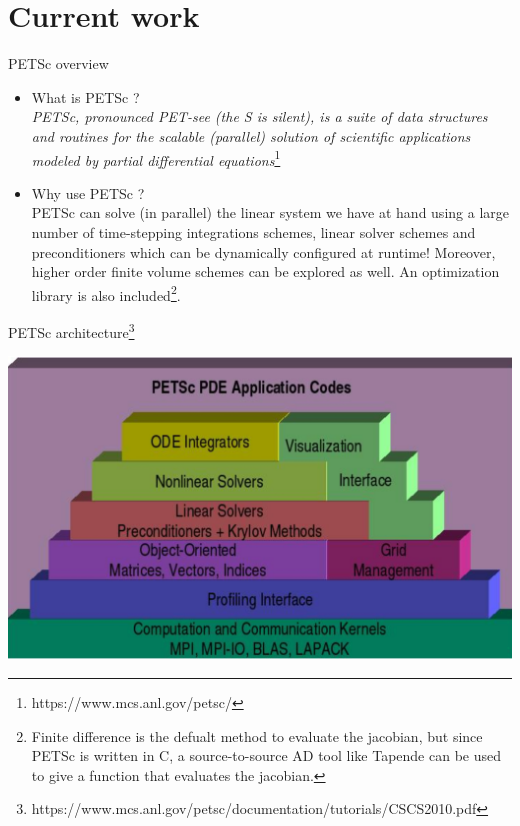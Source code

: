 \documentclass{beamer}
\begin{document}
\section{Current work}

\begin{frame}{PETSc overview}
\begin{itemize}
	\item What is PETSc ? 
	\\
		\qquad \textit{PETSc, pronounced PET-see (the S is silent), is a suite of data structures and routines for the scalable (parallel) solution of scientific applications modeled by partial differential equations}\footnote{https://www.mcs.anl.gov/petsc/}	\\
	\item Why use PETSc ?
	\\
		\qquad	PETSc can solve (in parallel) the linear system we have at hand using a large number of time-stepping integrations schemes, linear solver schemes and preconditioners which can be dynamically configured at runtime! Moreover, higher order finite volume schemes can be explored as well. An optimization library is also included\footnote{Finite difference is the defualt method to evaluate the jacobian, but since PETSc is written in C,  a source-to-source AD tool like Tapende can be used to give a function that evaluates the jacobian.}.
	\\
\end{itemize}
\end{frame}

\begin{frame}{PETSc architecture\footnote{https://www.mcs.anl.gov/petsc/documentation/tutorials/CSCS2010.pdf}}
\begin{center}
	\includegraphics[scale=0.225]{petsc}
\end{center}
\end{frame}
\end{document}
